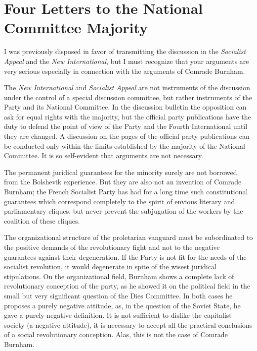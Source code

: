\chapter[Four Letters to the National Committee Majority]{Four Letters to the National Committee Majority}


I was previously disposed in favor of transmitting the discussion in the \emph{Socialist Appeal} and the \emph{New International}, but I must recognize that your arguments are very serious especially in connection with the arguments of Comrade Burnham.

The \emph{New International} and \emph{Socialist Appeal} are not instruments of the discussion under the control of a special discussion committee, but rather instruments of the Party and its National Committee. In the discussion bulletin the opposition can ask for equal rights with the majority, but the official party publications have the duty to defend the point of view of the Party and the Fourth International until they are changed. A discussion on the pages of the official party publications can be conducted only within the limits established by the majority of the National Committee. It is so self-evident that arguments are not necessary.

The permanent juridical guarantees for the minority surely are not borrowed from the Bolshevik experience. But they are also not an invention of Comrade Burnham; the French Socialist Party has had for a long time such constitutional guarantees which correspond completely to the spirit of envious literary and parliamentary cliques, but never prevent the subjugation of the workers by the coalition of these cliques.

The organizational structure of the proletarian vanguard must be subordinated to the positive demands of the revolutionary fight and not to the negative guarantees against their degeneration. If the Party is not fit for the needs of the socialist revolution, it would degenerate in spite of the wisest juridical stipulations. On the organizational field, Burnham shows a complete lack of revolutionary conception of the party, as he showed it on the political field in the small but very significant question of the Dies Committee. In both cases he proposes a purely negative attitude, as, in the question of the Soviet State, he gave a purely negative definition. It is not sufficient to dislike the capitalist society (a negative attitude), it is necessary to accept all the practical conclusions of a social revolutionary conception. Alas, this is not the case of Comrade Burnham.

